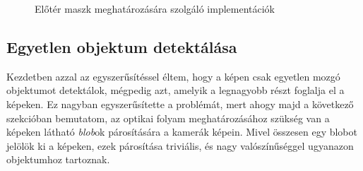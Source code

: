 \begin{figure}[tbh]
\centering


\caption{Előtér maszk meghatározására szolgáló implementációk \label{fig:cd:fg-mask-calc}}
\end{figure}

\subsection{Egyetlen objektum detektálása}

Kezdetben azzal az egyszerűsítéssel éltem, hogy a képen csak egyetlen mozgó objektumot detektálok, mégpedig azt, amelyik a legnagyobb részt foglalja el a képeken. Ez nagyban egyszerűsítette a problémát, mert ahogy majd a következő szekcióban bemutatom, az optikai folyam meghatározásához szükség van a képeken látható \textit{blob}ok párosítására a kamerák képein. Mivel összesen egy blobot jelölök ki a képeken, ezek párosítása triviális, és nagy valószínűséggel ugyanazon objektumhoz tartoznak.

